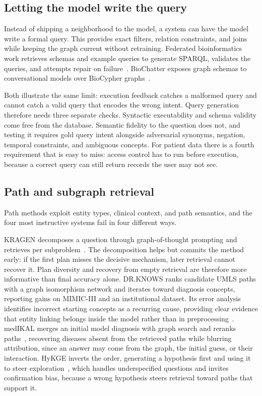 \subsection{Letting the model write the query}

Instead of shipping a neighborhood to the model, a system can have the model write a formal query. This provides exact filters, relation constraints, and joins while keeping the graph current without retraining. Federated bioinformatics work retrieves schemas and example queries to generate SPARQL, validates the queries, and attempts repair on failure~\cite{emonet2024sparql}. BioChatter exposes graph schemas to conversational models over BioCypher graphs~\cite{lobentanzer2024biochatter}.

Both illustrate the same limit: execution feedback catches a malformed query and cannot catch a valid query that encodes the wrong intent. Query generation therefore needs three separate checks. Syntactic executability and schema validity come free from the database. Semantic fidelity to the question does not, and testing it requires gold query intent alongside adversarial synonyms, negation, temporal constraints, and ambiguous concepts. For patient data there is a fourth requirement that is easy to miss: access control has to run before execution, because a correct query can still return records the user may not see.

\subsection{Path and subgraph retrieval}

Path methods exploit entity types, clinical context, and path semantics, and the four most instructive systems fail in four different ways.

KRAGEN decomposes a question through graph-of-thought prompting and retrieves per subproblem~\cite{matsumoto2024kragen}. The decomposition helps but commits the method early: if the first plan misses the decisive mechanism, later retrieval cannot recover it. Plan diversity and recovery from empty retrieval are therefore more informative than final accuracy alone. DR.KNOWS ranks candidate UMLS paths with a graph isomorphism network and iterates toward diagnosis concepts, reporting gains on MIMIC-III and an institutional dataset. Its error analysis identifies incorrect starting concepts as a recurring cause, providing clear evidence that entity linking belongs inside the model rather than in preprocessing~\cite{zuo2025drknows}. medIKAL merges an initial model diagnosis with graph search and reranks paths~\cite{jia2025medikal}, recovering diseases absent from the retrieved paths while blurring attribution, since an answer may come from the graph, the initial guess, or their interaction. HyKGE inverts the order, generating a hypothesis first and using it to steer exploration~\cite{jiang2025hykge}, which handles underspecified questions and invites confirmation bias, because a wrong hypothesis steers retrieval toward paths that support it.

